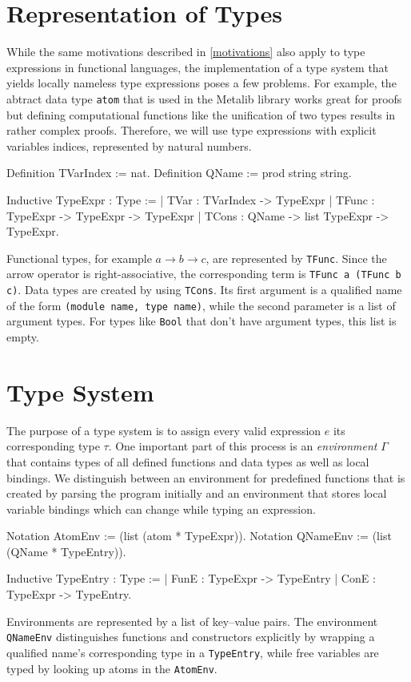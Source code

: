 \documentclass[a4paper, 11pt, fleqn]{scrreprt}
\newcommand{\coqinline}[1]{\texttt{#1}}
\begin{document}
    \section{Representation of Types}
    While the same motivations described in \autoref{motivations} also apply to type expressions in functional languages, the implementation of a type system that yields locally nameless type expressions poses a few problems. For example, the abtract data type \coqinline{atom} that is used in the Metalib library works great for proofs but defining computational functions like the unification of two types results in rather complex proofs. Therefore, we will use type expressions with explicit variables indices, represented by natural numbers.
    \begin{coqcode}
Definition TVarIndex := nat.
Definition QName := prod string string.

Inductive TypeExpr : Type :=
| TVar  : TVarIndex -> TypeExpr
| TFunc : TypeExpr  -> TypeExpr      -> TypeExpr
| TCons : QName     -> list TypeExpr -> TypeExpr.
    \end{coqcode}
	Functional types, for example $a \rightarrow b \rightarrow c$, are represented by \coqinline{TFunc}. Since the arrow operator is right-associative, the corresponding term is \coqinline{TFunc a (TFunc b c)}. Data types are created by using \coqinline{TCons}. Its first argument is a qualified name of the form \coqinline{(module name, type name)}, while the second parameter is a list of argument types. For types like \coqinline{Bool} that don't have argument types, this list is empty.
	
	\section{Type System}
	The purpose of a type system is to assign every valid expression $e$ its corresponding type $\tau$. One important part of this process is an \textit{environment} $\Gamma$ that contains types of all defined functions and data types as well as local bindings. We distinguish between an environment for predefined functions that is created by parsing the program initially and an environment that stores local variable bindings which can change while typing an expression.
	\begin{coqcode}
Notation AtomEnv := (list (atom * TypeExpr)).
Notation QNameEnv := (list (QName * TypeEntry)).
	\end{coqcode}
	\begin{coqcode}
Inductive TypeEntry : Type :=
| FunE : TypeExpr -> TypeEntry
| ConE : TypeExpr -> TypeEntry.
	\end{coqcode}
	Environments are represented by a list of key--value pairs. The environment \coqinline{QNameEnv} distinguishes functions and constructors explicitly by wrapping a qualified name's corresponding type in a \coqinline{TypeEntry}, while free variables are typed by looking up atoms in the \coqinline{AtomEnv}.
	
\end{document}
